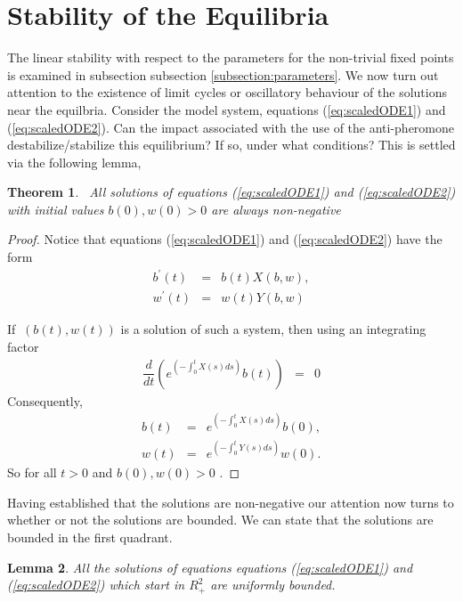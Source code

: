 \documentclass[review]{elsarticle}
\newtheorem{theorem}{Theorem}[section]
\newtheorem{lemma}[theorem]{Lemma}
\begin{document}
\section{Stability of the Equilibria}
\label{appendix:stability}

The linear stability with respect to the parameters for the
non-trivial fixed points is examined in subsection subsection
\ref{subsection:parameters}. We now turn out attention to the
existence of limit cycles or oscillatory behaviour of the solutions
near the equilbria. Consider the model system, equations
(\ref{eq:scaledODE1}) and (\ref{eq:scaledODE2}). Can the impact
associated with the use of the anti-pheromone destabilize/stabilize
this equilibrium? If so, under what conditions? This is settled via
the following lemma,
\begin{theorem}
  \bigskip\ All solutions of equations (\ref{eq:scaledODE1}) and
  (\ref{eq:scaledODE2}) with initial values
  $b\left( 0\right) ,w\left( 0\right) >0$ are always non-negative
\end{theorem}


\begin{proof}
  Notice that equations (\ref{eq:scaledODE1}) and
  (\ref{eq:scaledODE2}) have the form
\begin{eqnarray}
  b^{\prime}\left( t \right) & = & b(t)X\left( b,w\right), \\
  w^{\prime}\left( t \right) & = & w(t)Y\left( b,w\right)
\end{eqnarray}


If $\ \left( b\left( t\right) ,w\left( t\right) \right)
$ is a solution of such a system, then using an integrating factor
\begin{eqnarray}
\dfrac{d}{dt}\left( e^{\left( -\int_{0}^{t}X(s)ds\right) }b(t)\right) & = & 0
\end{eqnarray}
Consequently,
\begin{eqnarray}
b(t) & = & e^{\left( -\int_{0}^{t}X(s)ds\right) }b(0), \\
w(t) & = & e^{\left( -\int_{0}^{t}Y(s)ds\right) }w(0).
\end{eqnarray}
So for all $t>0$ and $b\left( 0\right) ,w\left( 0\right) >0$ .
\end{proof}

Having established that the solutions are non-negative our attention
now turns to whether or not the solutions are bounded. We can state
that the solutions are bounded in the first quadrant.

\begin{lemma} \label{mm} All the solutions of equations equations
  (\ref{eq:scaledODE1}) and (\ref{eq:scaledODE2}) which start in
  $R_{+}^{2}$ are uniformly bounded.
\end{lemma}
\end{document}
